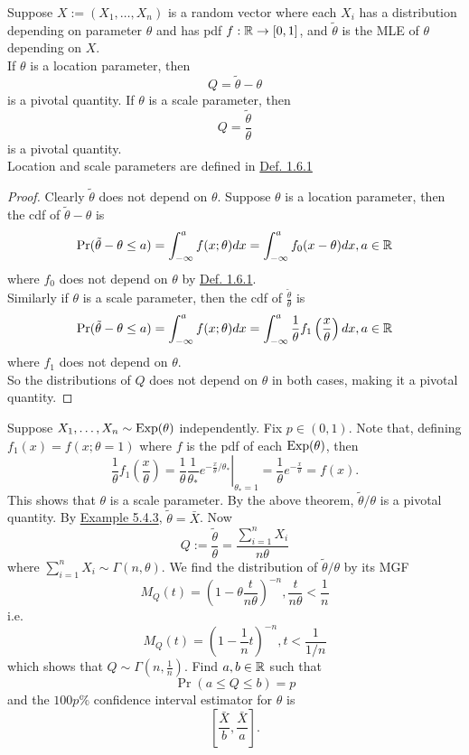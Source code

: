 \documentclass[11pt,fleqn]{book} %
\begin{document}
\begin{theorem} \label{thm:579}
Suppose \(X := (X_1, \ldots, X_n)\) is a random vector where each \(X_i\) has a distribution depending on parameter \(\theta\) and has pdf \(f: \mathbb{R}\rightarrow[0, 1]\), and \(\tilde{\theta}\) is the MLE of \(\theta\) depending on \(X\). \\
\indent If \(\theta\) is a location parameter, then
\[
Q = \tilde{\theta} - \theta
\]
is a pivotal quantity. If \(\theta\) is a scale parameter, then
\[
Q = \frac{\tilde{\theta}}{\theta}
\]
is a pivotal quantity. \\
\indent Location and scale parameters are defined in \hyperref[def:161]{Def. 1.6.1}
\end{theorem}
\begin{proof} Clearly \(\tilde{\theta}\) does not depend on \(\theta\). Suppose \(\theta\) is a location parameter, then the cdf of \(\tilde{\theta} - \theta\) is
\[
\Pr(\tilde{\theta} - \theta \leq a) = \int_{-\infty}^a f(x; \theta) dx = \int_{-\infty}^a f_0(x - \theta)dx, a \in \mathbb{R}
\]
where \(f_0\) does not depend on \(\theta\) by \hyperref[def:161]{Def. 1.6.1}. \\
\indent Similarly if \(\theta\) is a scale parameter, then the cdf of \(\frac{\tilde{\theta}}{\theta}\) is
\[
\Pr(\tilde{\theta} - \theta \leq a) = \int_{-\infty}^a f(x; \theta)dx = \int_{-\infty}^a\frac1\theta f_1\left(\frac{x}{\theta}\right)dx, a \in \mathbb{R}
\]
where \(f_1\) does not depend on \(\theta\). \\
\indent So the distributions of \(Q\) does not depend on \(\theta\) in both cases, making it a pivotal quantity.
\end{proof}

\begin{example} \label{eg:5710}
Suppose \(X_1, \ldots, X_n \sim \operatorname{Exp}(\theta)\) independently. Fix \(p \in (0, 1)\). Note that, defining \(f_1(x) = f(x; \theta = 1)\) where \(f\) is the pdf of each \(\operatorname{Exp}(\theta)\), then
\[
\frac1\theta f_1\left(\frac{x}{\theta}\right) = \left.\frac1\theta\frac1{\theta_*}e^{-\frac{x}{\theta}/\theta_*}\right|_{\theta_* = 1} = \frac1\theta e^{-\frac{x}{\theta}} = f(x).
\]
\indent This shows that \(\theta\) is a scale parameter. By the above theorem, \(\tilde{\theta}/\theta\) is a pivotal quantity. By \hyperref[eg:543]{Example 5.4.3}, \(\tilde{\theta} = \bar{X}\). Now
\[
Q := \frac{\tilde{\theta}}{\theta} = \frac{\sum_{i=1}^nX_i}{n\theta}
\]
where \(\sum_{i=1}^nX_i \sim \Gamma(n, \theta)\). We find the distribution of \(\tilde{\theta}/\theta\) by its MGF
\[
M_Q(t) = \left(1 - \theta\frac{t}{n\theta}\right)^{-n}, \frac{t}{n\theta} < \frac1n
\]
i.e.
\[
M_Q(t) = \left(1 - \frac1n t\right)^{-n}, t < \frac{1}{1 / n}
\]
which shows that \(Q \sim \Gamma\left(n, \frac1n\right)\). Find \(a, b \in \mathbb{R}\) such that
\[
\Pr(a \leq Q \leq b) = p
\]
and the \(100p\%\) confidence interval estimator for \(\theta\) is
\[
\left[\frac{\bar{X}}{b}, \frac{\bar{X}}{a}\right].
\]
\end{example}
\end{document}

